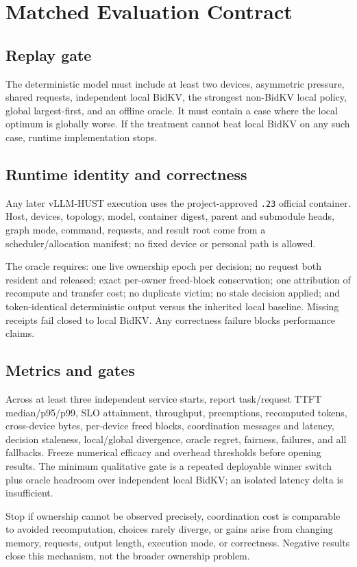 \documentclass[10pt]{article}
\begin{document}
\section{Matched Evaluation Contract}
\subsection{Replay gate}
The deterministic model must include at least two devices, asymmetric pressure,
shared requests, independent local BidKV, the strongest non-BidKV local policy,
global largest-first, and an offline oracle.  It must contain a case where the
local optimum is globally worse.  If the treatment cannot beat local BidKV on
any such case, runtime implementation stops.

\subsection{Runtime identity and correctness}
Any later vLLM-HUST execution uses the project-approved \texttt{.23} official
container.  Host, devices, topology, model, container digest, parent and
submodule heads, graph mode, command, requests, and result root come from a
scheduler/allocation manifest; no fixed device or personal path is allowed.

The oracle requires: one live ownership epoch per decision; no request both
resident and released; exact per-owner freed-block conservation; one attribution
of recompute and transfer cost; no duplicate victim; no stale decision applied;
and token-identical deterministic output versus the inherited local baseline.
Missing receipts fail closed to local BidKV.  Any correctness failure blocks
performance claims.

\subsection{Metrics and gates}
Across at least three independent service starts, report task/request TTFT
median/p95/p99, SLO attainment, throughput, preemptions, recomputed tokens,
cross-device bytes, per-device freed blocks, coordination messages and latency,
decision staleness, local/global divergence, oracle regret, fairness, failures,
and all fallbacks.  Freeze numerical efficacy and overhead thresholds before
opening results.  The minimum qualitative gate is a repeated deployable winner
switch plus oracle headroom over independent local BidKV; an isolated latency
delta is insufficient.

Stop if ownership cannot be observed precisely, coordination cost is comparable
to avoided recomputation, choices rarely diverge, or gains arise from changing
memory, requests, output length, execution mode, or correctness.  Negative
results close this mechanism, not the broader ownership problem.
\end{document}
